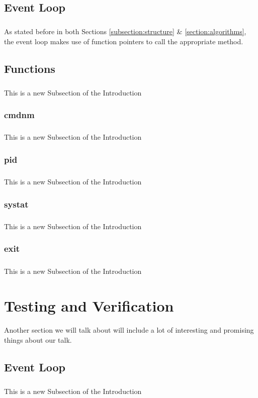 \documentclass[10pt]{article}
\begin{document}
\subsection{Event Loop}
\subparagraph{}
As stated before in both Sections \ref{subsection:structure} \& \ref{section:algorithms}, the event loop makes use of function pointers to call the appropriate method. 


\subsection{Functions}
\subparagraph{}
This is a new Subsection of the Introduction

\subsubsection{cmdnm}
\subparagraph{}
This is a new Subsection of the Introduction

\subsubsection{pid}
\subparagraph{}
This is a new Subsection of the Introduction


\subsubsection{systat}
\subparagraph{}
This is a new Subsection of the Introduction


\subsubsection{exit}
\subparagraph{}
This is a new Subsection of the Introduction


\section{Testing and Verification}
\paragraph{}
Another section we will talk about will include a lot of interesting and promising things about our talk.

\subsection{Event Loop}
\subparagraph{}
This is a new Subsection of the Introduction
\end{document}
